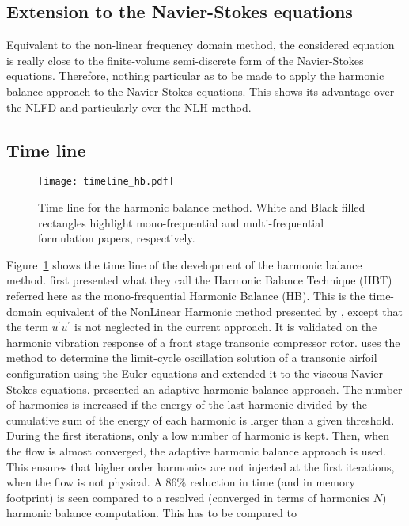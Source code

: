 \subsection{Extension to the Navier-Stokes equations}
Equivalent to the non-linear frequency domain method, the
considered equation is really close to the finite-volume
semi-discrete form of the Navier-Stokes equations. Therefore,
nothing particular as to be made to apply the harmonic balance approach
to the Navier-Stokes equations.
This shows its advantage over the NLFD and particularly over the NLH method.


\subsection{Time line}
\begin{figure}[htbp]
  \centering
  \texttt{[image: timeline\_hb.pdf]}
  \caption{Time line for the harmonic balance method. White and Black filled
rectangles highlight mono-frequential and multi-frequential formulation papers, respectively.}
  \label{fig:timeline_hb_mono}
\end{figure}
Figure~\ref{fig:timeline_hb_mono} shows the time line of the
development of the harmonic balance method.
\citet{Hall2002} first presented what they call
the Harmonic Balance Technique (HBT) referred here
as the mono-frequential Harmonic Balance (HB). This is 
the time-domain equivalent of the NonLinear Harmonic method
presented by \citet{He1998}, except that the term
$u^\prime u^\prime$ is not neglected in the
current approach. It is validated on 
the harmonic vibration response of a front 
stage transonic compressor rotor.
\citet{Thomas2002a} uses the method to
determine the limit-cycle oscillation solution
of a transonic airfoil configuration using the
Euler equations and \citet{Thomas2004b} extended
it to the viscous Navier-Stokes equations.
\citet{Maple2004} presented an adaptive harmonic
balance approach. The number of harmonics is increased
if the energy of the last harmonic divided by the cumulative
sum of the energy of each harmonic is larger than a 
given threshold. During the first iterations, only
a low number of harmonic is kept. Then, when the flow
is almost converged, the adaptive harmonic balance
approach is used. This ensures that higher order harmonics
are not injected at the first iterations, when the
flow is not physical. A $86\%$ reduction in time (and
in memory footprint) is seen compared to a resolved (converged in
terms of harmonics $N$) harmonic
balance computation. This has to be compared to
